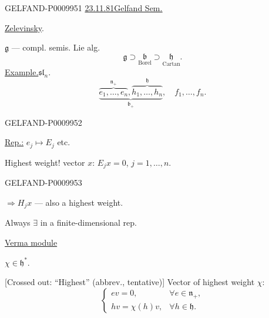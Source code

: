 \begin{GelfandAdjacentEvidence}{GELFAND-P000995}{1}
\underline{23.11.81}\qquad\underline{\underline{Gelfand Sem.}}

\underline{Zelevinsky}.

$\mathfrak g$ --- compl. semis. Lie alg.
\[
\mathfrak g\supset
\underset{\text{Borel}}{\mathfrak b}\supset
\underset{\text{Cartan}}{\mathfrak h}.
\]
\underline{Example.}\quad $\mathfrak{sl}_n$.
\[
\underbrace{
 \overbrace{e_1,\ldots,e_n}^{\mathfrak n_+},
 \overbrace{h_1,\ldots,h_n}^{\mathfrak h}
}_{\mathfrak b_+},
\quad f_1,\ldots,f_n.
\]
\end{GelfandAdjacentEvidence}
\begin{GelfandAdjacentEvidence}{GELFAND-P000995}{2}


\underline{Rep.:} $e_j\mapsto E_j$ etc.

Highest weight! vector $x$: $E_jx=0$, $j=1,\ldots,n$.
\end{GelfandAdjacentEvidence}
\begin{GelfandAdjacentEvidence}{GELFAND-P000995}{3}


$\Rightarrow H_jx$ --- also a highest weight.

Always $\exists$ in a finite-dimensional rep.

\underline{Verma module}

$\chi\in\mathfrak h^*$.

[Crossed out: “Highest” (abbrev., tentative)] Vector of highest weight $\chi$:
\[
\begin{cases}
ev=0,&\forall e\in\mathfrak n_+,\\
hv=\chi(h)v,&\forall h\in\mathfrak h.
\end{cases}
\]
\end{GelfandAdjacentEvidence}
